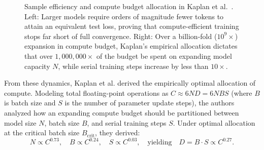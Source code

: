 \documentclass[../../../main.tex]{subfiles}
\begin{document}
\begin{figure}[t]
\caption{Sample efficiency and compute budget allocation in Kaplan et al.~\cite{kaplan2020}. Left: Larger models require orders of magnitude fewer tokens to attain an equivalent test loss, proving that compute-efficient training stops far short of full convergence. Right: Over a billion-fold ($10^9\times$) expansion in compute budget, Kaplan's empirical allocation dictates that over $1,000,000\times$ of the budget be spent on expanding model capacity $N$, while serial training steps increase by less than $10\times$.}
\label{fig:kaplan_figures2_3}
\end{figure}

From these dynamics, Kaplan et al. derived the empirically optimal allocation of compute. Modeling total floating-point operations as $C \approx 6 N D = 6 N B S$ (where $B$ is batch size and $S$ is the number of parameter update steps), the authors analyzed how an expanding compute budget should be partitioned between model size $N$, batch size $B$, and serial training steps $S$. Under optimal allocation at the critical batch size $B_{\text{crit}}$, they derived:
\begin{equation}
N \propto C^{0.73}, \quad B \propto C^{0.24}, \quad S \propto C^{0.03}, \quad \text{yielding} \quad D = B \cdot S \propto C^{0.27}.
\label{eq:kaplan_power_scaling}
\end{equation}
\end{document}
